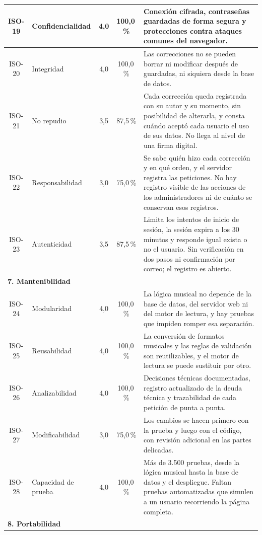 \documentclass[conference]{IEEEtran}
\begin{document}
\begin{table}[htbp]
\begin{tabular}{|c|p{2.8cm}|c|c|p{9.9cm}|}
\hline
ISO-19 & Confidencialidad & 4,0 & 100,0\,\% & Conexión cifrada, contraseñas guardadas de forma segura y protecciones contra ataques comunes del navegador. \\
\hline
ISO-20 & Integridad & 4,0 & 100,0\,\% & Las correcciones no se pueden borrar ni modificar después de guardadas, ni siquiera desde la base de datos. \\
\hline
ISO-21 & No repudio & 3,5 & 87,5\,\% & Cada corrección queda registrada con su autor y su momento, sin posibilidad de alterarla, y consta cuándo aceptó cada usuario el uso de sus datos. No llega al nivel de una firma digital. \\
\hline
ISO-22 & Responsabilidad & 3,0 & 75,0\,\% & Se sabe quién hizo cada corrección y en qué orden, y el servidor registra las peticiones. No hay registro visible de las acciones de los administradores ni de cuánto se conservan esos registros. \\
\hline
ISO-23 & Autenticidad & 3,5 & 87,5\,\% & Limita los intentos de inicio de sesión, la sesión expira a los 30 minutos y responde igual exista o no el usuario. Sin verificación en dos pasos ni confirmación por correo; el registro es abierto. \\
\hline
\multicolumn{5}{|l|}{\textbf{7. Mantenibilidad}} \\
\hline
ISO-24 & Modularidad & 4,0 & 100,0\,\% & La lógica musical no depende de la base de datos, del servidor web ni del motor de lectura, y hay pruebas que impiden romper esa separación. \\
\hline
ISO-25 & Reusabilidad & 4,0 & 100,0\,\% & La conversión de formatos musicales y las reglas de validación son reutilizables, y el motor de lectura se puede sustituir por otro. \\
\hline
ISO-26 & Analizabilidad & 4,0 & 100,0\,\% & Decisiones técnicas documentadas, registro actualizado de la deuda técnica y trazabilidad de cada petición de punta a punta. \\
\hline
ISO-27 & Modificabilidad & 3,0 & 75,0\,\% & Los cambios se hacen primero con la prueba y luego con el código, con revisión adicional en las partes delicadas. \\
\hline
ISO-28 & Capacidad de prueba & 4,0 & 100,0\,\% & Más de 3.500 pruebas, desde la lógica musical hasta la base de datos y el despliegue. Faltan pruebas automatizadas que simulen a un usuario recorriendo la página completa. \\
\hline
\multicolumn{5}{|l|}{\textbf{8. Portabilidad}} \\

\end{tabular}
\end{table}
\end{document}
